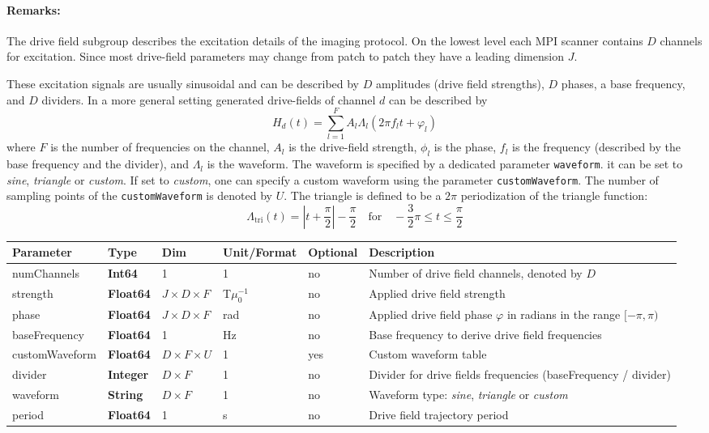 \documentclass[landscape,a4paper]{article} %
\newcommand{\inl}[1]{\lstinline[columns=fixed]{#1}}
\newcommand{\inltab}[1]{{\ttfamily\bfseries\color{blue}#1}}
\newcommand{\inlvar}[1]{{\ttfamily#1}}
\begin{document}
\begin{multicols}{2}
\paragraph{Remarks:} The drive field subgroup describes the excitation details of the imaging protocol. On the lowest level each MPI scanner contains $D$ channels for excitation. Since most drive-field parameters may change from patch to patch they have a leading dimension $J$.

These excitation signals are usually sinusoidal and can be described by $D$ amplitudes (drive field strengths), $D$ phases, a base frequency, and $D$ dividers. In a more general setting generated drive-fields of channel $d$ can be described by
$$
H_d(t) = \sum_{l=1}^{F} A_l \Lambda_l (2\pi f_l t + \varphi_l)
$$
where $F$ is the number of frequencies on the channel, $A_l$ is the drive-field strength, $\phi_l$ is the phase, $f_l$ is the frequency (described by the base frequency and the divider), and $\Lambda_l$ is the waveform. The waveform is specified by a dedicated parameter \inl{waveform}. it can be set to \textit{sine}, \textit{triangle} or \textit{custom}. If set to \textit{custom}, one can specify a custom waveform using the parameter \inl{customWaveform}. The number of sampling points of the \inl{customWaveform} is denoted by $U$. The triangle is defined to be a $2\pi$ periodization of the
triangle function:
$$
 \Lambda_\text{tri}(t) = \left\vert t+\frac{\pi}{2}\right\vert - \frac{\pi}{2} \quad \text{for} \quad -\frac{3}{2}\pi\leq t \leq \frac{\pi}{2}
$$
\end{multicols}

\noindent \begin{tabularx}{\columnwidth}{lllllX} 
\textbf{Parameter} & \textbf{Type} & \textbf{Dim} & \textbf{Unit/Format} & \textbf{Optional} & \textbf{Description} \\ \hline 
\inlvar{numChannels} & \inltab{Int64} & 1 & 1 & no & Number of drive field channels, denoted by $D$ \\ \hline
\inlvar{strength} & \inltab{Float64} & $J \times D \times F $ & T$\mu_0^{-1}$ & no & Applied drive field strength \\ \hline
\inlvar{phase} & \inltab{Float64} & $J \times D \times F$ & rad & no & Applied drive field phase $\varphi$ in radians in the range $[-\pi,\pi)$ \\ \hline
\inlvar{baseFrequency} & \inltab{Float64} & 1 & Hz & no & Base frequency to derive drive field frequencies \\ \hline
\inlvar{customWaveform} & \inltab{Float64} & $D \times F \times U$ & 1 & yes & Custom waveform table \\ \hline
\inlvar{divider} & \inltab{Integer} & $D \times F$ & 1 & no & Divider for drive fields frequencies (\inlvar{baseFrequency} / \inlvar{divider}) \\ \hline
\inlvar{waveform} & \inltab{String} & $D \times F$ & 1 & no & Waveform type: \textit{sine}, \textit{triangle} or \textit{custom} \\ \hline
\inlvar{period} & \inltab{Float64} & 1 & s & no & Drive field trajectory period \\ \hline
\end{tabularx}
\end{document}

